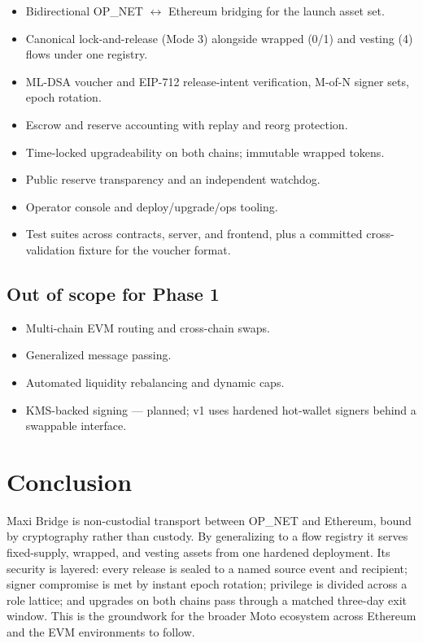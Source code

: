 \documentclass[11pt,a4paper]{article}
\begin{document}
\begin{itemize}
  \item Bidirectional OP\_NET $\leftrightarrow$ Ethereum bridging for the launch asset set.
  \item Canonical lock-and-release (Mode 3) alongside wrapped (0/1) and vesting (4) flows under one registry.
  \item ML-DSA voucher and EIP-712 release-intent verification, M-of-N signer sets, epoch rotation.
  \item Escrow and reserve accounting with replay and reorg protection.
  \item Time-locked upgradeability on both chains; immutable wrapped tokens.
  \item Public reserve transparency and an independent watchdog.
  \item Operator console and deploy/upgrade/ops tooling.
  \item Test suites across contracts, server, and frontend, plus a committed cross-validation fixture for the voucher format.
\end{itemize}

\subsection*{Out of scope for Phase 1}

\begin{itemize}
  \item Multi-chain EVM routing and cross-chain swaps.
  \item Generalized message passing.
  \item Automated liquidity rebalancing and dynamic caps.
  \item KMS-backed signing --- planned; v1 uses hardened hot-wallet signers behind a swappable interface.
\end{itemize}

\section{Conclusion}

Maxi Bridge is non-custodial transport between OP\_NET and Ethereum, bound by cryptography rather than custody. By generalizing to a flow registry it serves fixed-supply, wrapped, and vesting assets from one hardened deployment. Its security is layered: every release is sealed to a named source event and recipient; signer compromise is met by instant epoch rotation; privilege is divided across a role lattice; and upgrades on both chains pass through a matched three-day exit window. This is the groundwork for the broader Moto ecosystem across Ethereum and the EVM environments to follow.
\end{document}
